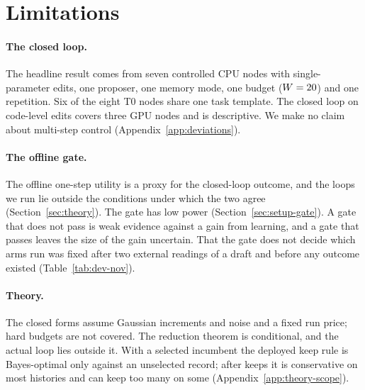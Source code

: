 \section{Limitations}
\label{sec:limitations}

\paragraph{The closed loop.}
The headline result comes from seven controlled CPU nodes with single-parameter edits, one proposer, one memory mode, one budget ($W=20$) and one repetition. Six of the eight T0 nodes share one task template. The closed loop on code-level edits covers three GPU nodes and is descriptive. We make no claim about multi-step control (Appendix~\ref{app:deviations}).

\paragraph{The offline gate.}
The offline one-step utility is a proxy for the closed-loop outcome, and the loops we run lie outside the conditions under which the two agree (Section~\ref{sec:theory}). The gate has low power (Section~\ref{sec:setup-gate}). A gate that does not pass is weak evidence against a gain from learning, and a gate that passes leaves the size of the gain uncertain. That the gate does not decide which arms run was fixed after two external readings of a draft and before any outcome existed (Table~\ref{tab:dev-nov}).

\paragraph{Theory.}
The closed forms assume Gaussian increments and noise and a fixed run price; hard budgets are not covered. The reduction theorem is conditional, and the actual loop lies outside it.
With a selected incumbent the deployed keep rule is Bayes-optimal only against an unselected record; after keeps it is conservative on most histories and can keep too many on some (Appendix~\ref{app:theory-scope}).

